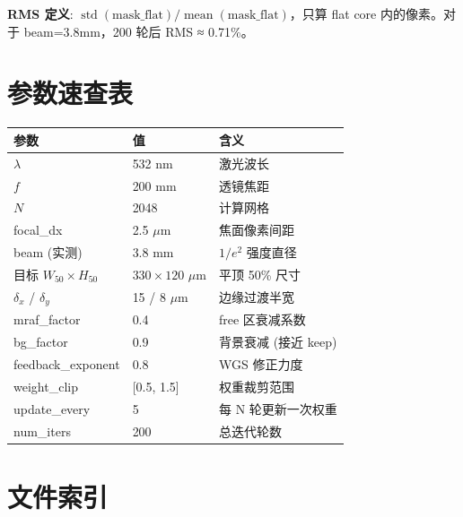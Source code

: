 \documentclass[11pt,a4paper]{ctexart}
\begin{document}
\textbf{RMS 定义}: $\operatorname{std}(\text{mask\_flat}) / \operatorname{mean}(\text{mask\_flat})$，只算 flat core 内的像素。对于 beam=3.8mm，200 轮后 RMS ≈ 0.71\%。

\section{参数速查表}

\begin{center}
\begin{tabular}{p{}p{}p{}}
\toprule
\textbf{参数} & \textbf{值} & \textbf{含义} \\
\midrule
$\lambda$                              & 532 nm          & 激光波长 \\
$f$                                    & 200 mm          & 透镜焦距 \\
$N$                                    & 2048            & 计算网格 \\
focal\_dx                              & 2.5 $\mu$m      & 焦面像素间距 \\
beam (实测)                            & 3.8 mm          & $1/e^2$ 强度直径 \\
目标 $W_{50}\times H_{50}$            & $330\times120$ $\mu$m & 平顶 50\% 尺寸 \\
$\delta_x$ / $\delta_y$                & 15 / 8 $\mu$m   & 边缘过渡半宽 \\
mraf\_factor                           & 0.4             & free 区衰减系数 \\
bg\_factor                             & 0.9             & 背景衰减 (接近 keep) \\
feedback\_exponent                     & 0.8             & WGS 修正力度 \\
weight\_clip                           & [0.5, 1.5]      & 权重裁剪范围 \\
update\_every                          & 5               & 每 N 轮更新一次权重 \\
num\_iters                             & 200             & 总迭代轮数 \\
\bottomrule
\end{tabular}
\end{center}

\section{文件索引}
\end{document}
